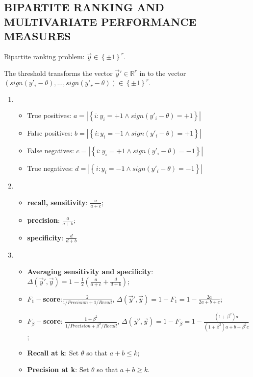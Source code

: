 \subsection{BIPARTITE RANKING AND MULTIVARIATE PERFORMANCE MEASURES}%
\label{sub:bipartite_ranking_and_multivariate_performance_measures} 

Bipartite ranking problem: $ \vec{y} \in {\left\{ \pm 1 \right\}}^r $.

The threshold transforms the vector $ \vec{y}' \in \mathbb{R}^r $ in to the vector $ (sign(y'_i - \theta), \ldots, sign(y'_r - \theta)) \in {\left\{ \pm 1 \right\}}^r $.

\begin{enumerate}
    \item 
        \begin{itemize}
            \item True positives: $ a = \left| \left\{ i: y_i = +1 \wedge sign(y'_i - \theta) = +1 \right\} \right| $
            \item False positives: $ b = \left| \left\{ i: y_i = -1 \wedge sign(y'_i - \theta) = + 1 \right\} \right| $
            \item False negatives: $ c = \left| \left\{ i: y_i = +1 \wedge sign(y'_i - \theta) = -1 \right\} \right| $
            \item True negatives: $ d = \left| \left\{ i: y_i = -1 \wedge sign(y'_i - \theta) = -1 \right\} \right| $
        \end{itemize}
    \item 
        \begin{itemize}
            \item \textbf{recall, sensitivity}: $ \frac{a}{a+c} $;
            \item \textbf{precision}: $ \frac{a}{a+b} $;
            \item \textbf{specificity}: $ \frac{d}{d+b} $
        \end{itemize}
    \item
        \begin{itemize}
            \item \textbf{Averaging sensitivity and specificity}: $ \Delta(\vec{y}', \vec{y}) = 1 - \frac{1}{2} \left( \frac{a}{a+c} + \frac{d}{d+b} \right) $;
            \item $ F_1-$\textbf{score}:$ \frac{2}{1/Precision + 1/Recall} $, $ \Delta(\vec{y}', \vec{y}) = 1 - F_1 = 1- \frac{2a}{2a+b+c} $;
            \item $ F_\beta- $\textbf{score}: $ \frac{1+\beta^2}{1/Precision + \beta^2/Recall} $, $ \Delta(\vec{y}', \vec{y}) = 1 - F_\beta = 1 - \frac{(1+\beta^2) a}{(1+\beta^2)a + b + \beta^2 c}  $;
            \item \textbf{Recall at k}: Set $ \theta $ so that $ a + b \le k $;
            \item \textbf{Precision at k}: Set $ \theta $ so that $ a + b \ge k $.
        \end{itemize}
\end{enumerate}

